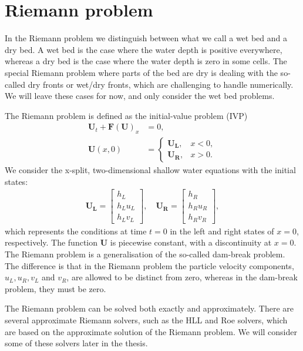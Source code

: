 \section{Riemann problem}
In the Riemann problem we distinguish between what we call a wet bed and a dry bed. 
A wet bed is the case where the water depth is positive everywhere, whereas a dry bed is the case where the water depth is zero in some cells.
The special Riemann problem where parts of the bed are dry is dealing with the so-called dry fronts or wet/dry fronts, which are challenging to handle numerically.
We will leave these cases for now, and only consider the wet bed problems.

The Riemann problem is defined as the initial-value problem (IVP)
\begin{align}\label{eq:Riemann_problem}
    \mathbf{U}_t + {\mathbf{F(U)}}_x &= 0, \\
\mathbf{U}(x, 0) &= \begin{cases}
    \mathbf{U_L}, & x < 0, \\
    \mathbf{U_R}, & x > 0.
\end{cases}
\end{align}
We consider the x-split, two-dimensional shallow water equations with the initial states:
\begin{align*}
    \mathbf{U_L} = \begin{bmatrix}
        h_L \\ h_L u_L \\ h_L v_L
    \end{bmatrix}, \quad 
    \mathbf{U_R} = \begin{bmatrix}
        h_R \\ h_R u_R \\ h_R v_R
    \end{bmatrix},
\end{align*}
which represents the conditions at time $t = 0$ in the left and right states of $x=0$, respectively.
The function $\mathbf{U}$ is piecewise constant, with a discontinuity at $x=0$.
The Riemann problem is a generalisation of the so-called dam-break problem.
The difference is that in the Riemann problem the particle velocity components, $u_L, u_R, v_L$ and $v_R$, are allowed to be distinct from zero, whereas in the dam-break problem, they must be zero.

The Riemann problem can be solved both exactly and approximately.
There are several approximate Riemann solvers, such as the HLL and Roe solvers, which are based on the approximate solution of the Riemann problem.
We will consider some of these solvers later in the thesis.

